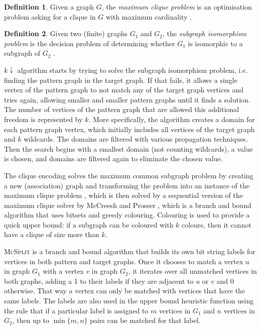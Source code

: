 \documentclass{l4proj}
\theoremstyle{definition}
\newtheorem{definition}{Definition}[chapter]
\theoremstyle{remark}
\begin{document}
\begin{definition}
  Given a graph $G$, the \emph{maximum clique problem} is an optimisation problem
  asking for a clique in $G$ with maximum cardinality
  \cite{DBLP:journals/jgo/PardalosX94a}.
\end{definition}

\begin{definition}
  Given two (finite) graphs $G_1$ and $G_2$, the \emph{subgraph isomorphism
    problem} is the decision problem of determining whether $G_1$ is isomorphic
  to a subgraph of $G_2$ \cite{DBLP:conf/stoc/Cook71}.
\end{definition}

$k\downarrow$ algorithm \cite{DBLP:conf/aaai/HoffmannMR17} starts by trying to
solve the subgraph isomorphism problem, i.e. finding the pattern graph in the
target graph. If that fails, it allows a single vertex of the pattern graph to
not match any of the target graph vertices and tries again, allowing smaller and
smaller pattern graphs until it finds a solution. The number of vertices of the
pattern graph that are allowed this additional freedom is represented by $k$.
More specifically, the algorithm creates a domain for each pattern graph vertex,
which initially includes all vertices of the target graph and $k$ wildcards. The
domains are filtered with various propagation techniques. Then the search begins
with a smallest domain (not counting wildcards), a value is chosen, and domains
are filtered again to eliminate the chosen value.

The clique encoding \cite{DBLP:conf/cp/McCreeshNPS16} solves the
maximum common subgraph problem by creating a new (association) graph and
transforming the problem into an instance of the maximum clique problem
\cite{Levi1973}, which is then solved by a sequential version of the maximum
clique solver by McCreesh and Prosser \cite{DBLP:journals/topc/McCreeshP15},
which is a branch and bound algorithm that uses bitsets and greedy colouring.
Colouring is used to provide a quick upper bound: if a subgraph can be coloured
with $k$ colours, then it cannot have a clique of size more than $k$.

\textsc{McSplit} \cite{DBLP:conf/ijcai/McCreeshPT17} is a branch and bound
algorithm that builds its own bit string labels for vertices in both pattern and
target graphs. Once it chooses to match a vertex $u$ in graph $G_1$ with a
vertex $v$ in graph $G_2$, it iterates over all unmatched vertices in both
graphs, adding a 1 to their labels if they are adjacent to $u$ or $v$ and 0
otherwise. That way a vertex can only be matched with vertices that have the
same labels. The labels are also used in the upper bound heuristic function
using the rule that if a particular label is assigned to $m$ vertices in $G_1$
and $n$ vertices in $G_2$, then up to $\min \{ m, n \}$ pairs can be matched for
that label.
\end{document}
